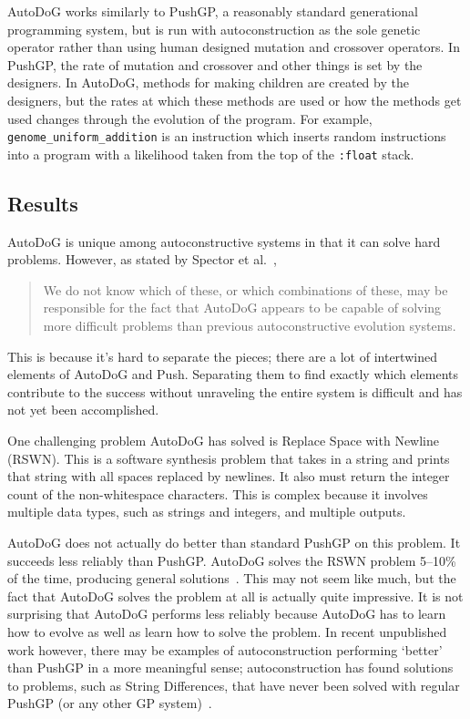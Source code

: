 \documentclass{sig-alternate}
\begin{document}
AutoDoG works similarly to PushGP, a reasonably standard generational programming system, but is run with autoconstruction as the sole genetic operator rather than using human designed mutation and crossover operators. In PushGP, the rate of mutation and crossover and other things is set by the designers. In AutoDoG, methods for making children are created by the designers, but the rates at which these methods are used or how the methods get used changes through the evolution of the program. For example, \texttt{genome\_uniform\_addition} is an instruction which inserts random instructions into a program with a likelihood taken from the top of the \texttt{:float} stack.

\subsection{Results}
\label{sec:results}
AutoDoG is unique among autoconstructive systems in that it can solve hard problems. However, as stated by Spector et al.~\cite{spector:2016},
\begin{quotation}
	We do not know which of these, or which combinations of these, may be responsible for the fact that AutoDoG appears to be capable of solving more difficult problems than previous autoconstructive evolution systems.
\end{quotation}
This is because it's hard to separate the pieces; there are a lot of intertwined elements of AutoDoG and Push. Separating them to find exactly which elements contribute to the success without unraveling the entire system is difficult and has not yet been accomplished.

One challenging problem AutoDoG has solved is Replace Space with Newline (RSWN). This is a software synthesis problem that takes in a string and prints that string with all spaces replaced by newlines. It also must return the integer count of the non-whitespace characters. This is complex because it involves multiple data types, such as strings and integers, and multiple outputs.

AutoDoG does not actually do better than standard PushGP on this problem. It succeeds less reliably than PushGP. AutoDoG solves the RSWN problem 5--10\% of the time, producing general solutions~\cite{spector:2016}. This may not seem like much, but the fact that AutoDoG solves the problem at all is actually quite impressive. It is not surprising that AutoDoG performs less reliably because AutoDoG has to learn how to evolve as well as learn how to solve the problem. In recent unpublished work however, there may be examples of autoconstruction performing `better' than PushGP in a more meaningful sense; autoconstruction has found solutions to problems, such as String Differences, that have never been solved with regular PushGP (or any other GP system)~\cite{eva:2017}.
\end{document}
